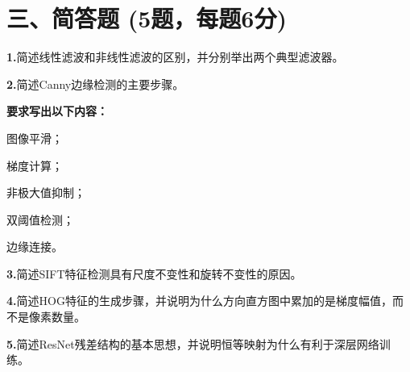\documentclass[UTF8,openany,oneside,zihao=-4,fontset=windows]{ctexbook}
\newif\ifshowsolutions
\newcommand{\Question}[2]{%
  \par\Needspace{4\baselineskip}\medskip
  \noindent\textbf{\color{MVBlue}#1}\quad #2\par
}
\newcommand{\PracticeSpace}[1]{\ifshowsolutions\else\par\vspace{#1}\par\fi}
\begin{document}
\section{三、简答题 (5题，每题6分)}
\Question{1.}{简述线性滤波和非线性滤波的区别，并分别举出两个典型滤波器。}
\PracticeSpace{2.4cm}
\Question{2.}{简述Canny边缘检测的主要步骤。}
\par\noindent\textbf{要求写出以下内容：}
\par\noindent\textbullet\quad 图像平滑；
\par\noindent\textbullet\quad 梯度计算；
\par\noindent\textbullet\quad 非极大值抑制；
\par\noindent\textbullet\quad 双阈值检测；
\par 边缘连接。
\PracticeSpace{2.4cm}
\Question{3.}{简述SIFT特征检测具有尺度不变性和旋转不变性的原因。}
\PracticeSpace{2.4cm}
\Question{4.}{简述HOG特征的生成步骤，并说明为什么方向直方图中累加的是梯度幅值，而不是像素数量。}
\PracticeSpace{2.4cm}
\Question{5.}{简述ResNet残差结构的基本思想，并说明恒等映射为什么有利于深层网络训练。}
\PracticeSpace{2.4cm}
\end{document}
